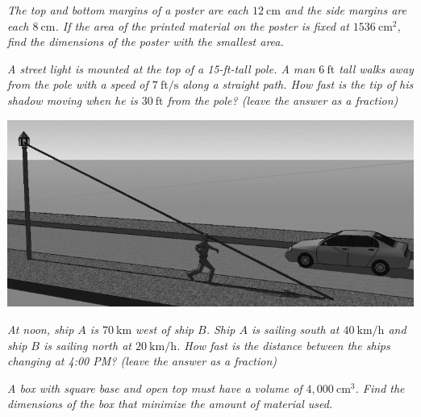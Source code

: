 \documentclass[12pt]{article}
\begin{document}
{\problem[50 pts] \em\large The top and bottom margins of a poster are each $12~\text{cm}$ and the side margins are each $8~\text{cm}$.  If the area of the printed material on the poster is fixed at $1536~\text{cm}^2$, find the dimensions of the poster with the smallest area.}

\begin{center}
\end{center}

{\problem[50 pts] \em\large A street light is mounted at the top of a 15-ft-tall pole.  A man $6~\text{ft}$ tall walks away from the pole with a speed of $7~\text{ft}/\text{s}$ along a straight path.  How fast is the tip of his shadow moving when he is $30~\text{ft}$ from the pole? (leave the answer as a fraction)}

\begin{center}
  \includegraphics[width=0.5\linewidth]{casey1.png}
\end{center}

{\problem[50 pts] \em\large At noon, ship $A$ is $70~\text{km}$ west of ship $B$.  Ship $A$ is sailing south at $40~\text{km}/\text{h}$ and ship $B$ is sailing north at $20~\text{km}/\text{h}$.  How fast is the distance between the ships changing at 4:00 PM? (leave the answer as a fraction)}
 
{\problem[50 pts] \em\large A box with square base and open top must have a volume of $4,000~\text{cm}^3$.  Find the dimensions of the box that minimize the amount of material used.}
\end{document}
